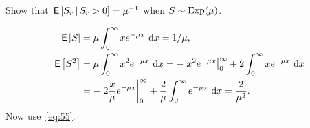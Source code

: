 \documentclass[companion]{subfiles}
\begin{document}
\begin{extra}
 Show that $\,\mathsf{E}\left[S_r\,\middle|\, S_r>0\right] = \mu^{-1}$ when $S\sim \operatorname{Exp}(\mu)$.
\begin{solution}
 \begin{align*}
\,\mathsf{E}\left[S\right] &= \mu \int_0^\infty x e^{-\mu x}\,\,\text{d}x = 1/\mu, \\
\,\mathsf{E}\left[S^2\right] 
&= \mu \int_0^\infty x^2 e^{- \mu x} \,\,\text{d}x = - \left. x^2 e^{-\mu x} \right|_0^\infty + 2 \int_0^\infty x e^{-\mu x} \, \,\text{d}x \\
&= -\left. 2\frac x \mu e^{-\mu x} \right|_0^\infty + \frac 2 \mu\int_0^\infty e^{-\mu x} \, \,\text{d}x =\frac2{\mu^2}.
 \end{align*}
Now use~\cref{eq:55}.
\end{solution}
\end{extra}




\end{document}
